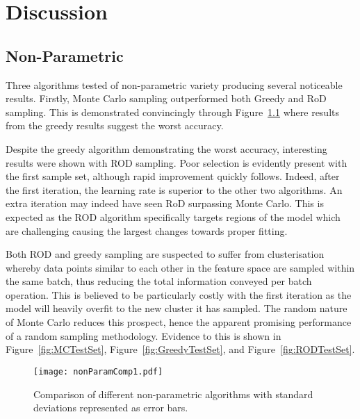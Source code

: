 \chapter{Discussion}


\graphicspath{{Chapter5/Figs/Vector/}{Chapter5/Figs/}}


\section{Non-Parametric}
Three algorithms tested of non-parametric variety producing several noticeable results. Firstly, Monte Carlo sampling outperformed both Greedy and RoD sampling. This is demonstrated convincingly through Figure~\ref{fig:nPComp} where results from the greedy results suggest the worst accuracy.

Despite the greedy algorithm demonstrating the worst accuracy, interesting results were shown with ROD sampling. Poor selection is evidently present with the first sample set, although rapid improvement quickly follows. Indeed, after the first iteration, the learning rate is superior to the other two algorithms. An extra iteration may indeed have seen RoD surpassing Monte Carlo. This is expected as the ROD algorithm specifically targets regions of the model which are challenging causing the largest changes towards proper fitting.

Both ROD and greedy sampling are suspected to suffer from clusterisation whereby data points similar to each other in the feature space are sampled within the same batch, thus reducing the total information conveyed per batch operation. This is believed to be particularly costly with the first iteration as the model will heavily overfit to the new cluster it has sampled. The random nature of Monte Carlo reduces this prospect, hence the apparent promising performance of a random sampling methodology. Evidence to this is shown in Figure~\ref{fig:MCTestSet}, Figure~\ref{fig:GreedyTestSet}, and Figure~\ref{fig:RODTestSet}.

\begin{figure}[h]
    \begin{center}
        \texttt{[image: nonParamComp1.pdf]}
        \caption[Non-parametric comparison]{Comparison of different non-parametric algorithms with standard deviations represented as error bars.}
        \label{fig:nPComp}
    \end{center}
\end{figure}


